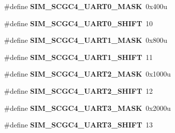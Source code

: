 \begin{DoxyCompactItemize}
\item 
\#define {\bfseries S\+I\+M\+\_\+\+S\+C\+G\+C4\+\_\+\+U\+A\+R\+T0\+\_\+\+M\+A\+SK}~0x400u\hypertarget{group__SIM__Register__Masks_ga8fc8faeefc38393c83454ceba120d5df}{}\label{group__SIM__Register__Masks_ga8fc8faeefc38393c83454ceba120d5df}

\item 
\#define {\bfseries S\+I\+M\+\_\+\+S\+C\+G\+C4\+\_\+\+U\+A\+R\+T0\+\_\+\+S\+H\+I\+FT}~10\hypertarget{group__SIM__Register__Masks_gae3407d4e1676ac6654898712335842b0}{}\label{group__SIM__Register__Masks_gae3407d4e1676ac6654898712335842b0}

\item 
\#define {\bfseries S\+I\+M\+\_\+\+S\+C\+G\+C4\+\_\+\+U\+A\+R\+T1\+\_\+\+M\+A\+SK}~0x800u\hypertarget{group__SIM__Register__Masks_ga24a3ebc9f4c6154041b1a39b33f3c121}{}\label{group__SIM__Register__Masks_ga24a3ebc9f4c6154041b1a39b33f3c121}

\item 
\#define {\bfseries S\+I\+M\+\_\+\+S\+C\+G\+C4\+\_\+\+U\+A\+R\+T1\+\_\+\+S\+H\+I\+FT}~11\hypertarget{group__SIM__Register__Masks_ga2eda3e80bcf9a5ee77ce321d86cd92d0}{}\label{group__SIM__Register__Masks_ga2eda3e80bcf9a5ee77ce321d86cd92d0}

\item 
\#define {\bfseries S\+I\+M\+\_\+\+S\+C\+G\+C4\+\_\+\+U\+A\+R\+T2\+\_\+\+M\+A\+SK}~0x1000u\hypertarget{group__SIM__Register__Masks_gaea7b7b8d6abc055026d4ca7299206597}{}\label{group__SIM__Register__Masks_gaea7b7b8d6abc055026d4ca7299206597}

\item 
\#define {\bfseries S\+I\+M\+\_\+\+S\+C\+G\+C4\+\_\+\+U\+A\+R\+T2\+\_\+\+S\+H\+I\+FT}~12\hypertarget{group__SIM__Register__Masks_gae844b2ce3371466add7387b9ea32bc4c}{}\label{group__SIM__Register__Masks_gae844b2ce3371466add7387b9ea32bc4c}

\item 
\#define {\bfseries S\+I\+M\+\_\+\+S\+C\+G\+C4\+\_\+\+U\+A\+R\+T3\+\_\+\+M\+A\+SK}~0x2000u\hypertarget{group__SIM__Register__Masks_gaaf5646fd261bf76417a69902f7405a98}{}\label{group__SIM__Register__Masks_gaaf5646fd261bf76417a69902f7405a98}

\item 
\#define {\bfseries S\+I\+M\+\_\+\+S\+C\+G\+C4\+\_\+\+U\+A\+R\+T3\+\_\+\+S\+H\+I\+FT}~13\hypertarget{group__SIM__Register__Masks_ga065aa606af68b4a53adc773e6661b67d}{}\label{group__SIM__Register__Masks_ga065aa606af68b4a53adc773e6661b67d}


\end{DoxyCompactItemize}
